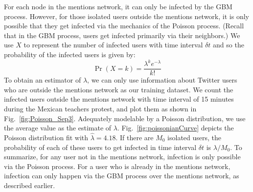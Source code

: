 For each node in the mentions network, it can only be infected by the GBM process. However, for those isolated users outside the mentions network, it is only possible that they get infected via the mechanics of the Poisson process.
(Recall that in the GBM process, users get infected primarily
via their neighbors.) We use $X$ to represent the number of infected users
with time interval $\delta t$ and so the probability of the infected users is
given by:
\begin{equation}\Pr(X=k)= \frac{\lambda^k e^{-\lambda}}{k!}\end{equation}
To obtain an estimator of $\lambda$, we can only use information
about Twitter users who are outside the mentions network as our training dataset. We count the infected users outside the mentions network with time interval of 15 minutes during the Mexican teachers protest, and plot them as shown in Fig.~\ref{fig:Poisson_Sep3}.
Adequately modelable by a Poisson distribution, we use the average value as the estimate of $\lambda$. Fig.~\ref{fig:poissonianCurve} depicts the Poisson distribution fit with $\hat{\lambda}=4.18$. If there are $M_0$ isolated users, the probability of each of these users to get infected in time interval $\delta t$ is $\lambda/M_0$.
To summarize, for any user not in the mentions network, infection
is only possible via the Poisson process. For a user who is already in the
mentions network, infection can only happen via the GBM process over the mentions network, as described earlier.
